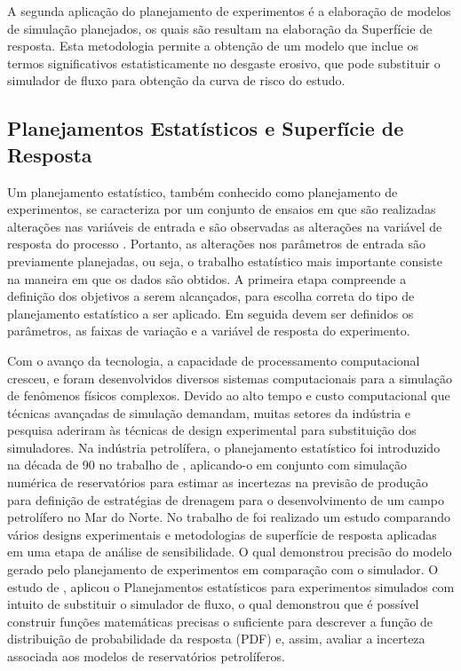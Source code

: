 A segunda aplicação do planejamento de experimentos é a elaboração de modelos de simulação planejados, os quais são resultam na elaboração da Superfície de resposta. Esta metodologia permite a obtenção de um modelo que inclue os termos significativos estatisticamente no desgaste erosivo, que pode substituir o simulador de fluxo para obtenção da curva de risco do estudo. 


\subsection{Planejamentos Estatísticos e Superfície de Resposta}


Um planejamento estatístico, também conhecido como planejamento de experimentos, se caracteriza por um conjunto de ensaios em que são realizadas alterações nas variáveis de entrada e são observadas as alterações na variável de resposta do processo \cite{myers}. Portanto, as alterações nos parâmetros de entrada são previamente planejadas, ou seja, o trabalho estatístico mais importante consiste na maneira em que os dados são obtidos. A primeira etapa compreende a definição dos objetivos a serem alcançados, para escolha correta do tipo de planejamento estatístico a ser aplicado. Em seguida devem ser definidos os parâmetros, as faixas de variação e a variável de resposta do experimento. 

Com o avanço da tecnologia, a capacidade de processamento computacional cresceu, e foram desenvolvidos diversos sistemas computacionais para a simulação de fenômenos físicos complexos. Devido ao alto tempo e custo computacional que técnicas avançadas de simulação demandam, muitas setores da indústria e pesquisa aderiram às técnicas de design experimental para substituição dos simuladores. Na indústria petrolífera, o planejamento estatístico foi introduzido na década de 90 no trabalho de , aplicando-o em conjunto com simulação numérica de reservatórios para estimar as incertezas na previsão de produção para definição de estratégias de drenagem para o desenvolvimento de um campo petrolífero no Mar do Norte. No trabalho de  foi realizado um estudo comparando vários designs experimentais e metodologias de superfície de resposta aplicadas em uma etapa de análise de sensibilidade. O qual demonstrou precisão do modelo gerado pelo planejamento de experimentos em comparação com o simulador. O estudo de , aplicou o Planejamentos estatísticos para experimentos simulados com intuito de substituir o simulador de fluxo, o qual demonstrou que é possível construir funções matemáticas precisas o suficiente para descrever a função de distribuição de probabilidade da resposta (PDF) e, assim, avaliar a incerteza associada aos modelos de reservatórios petrolíferos.

